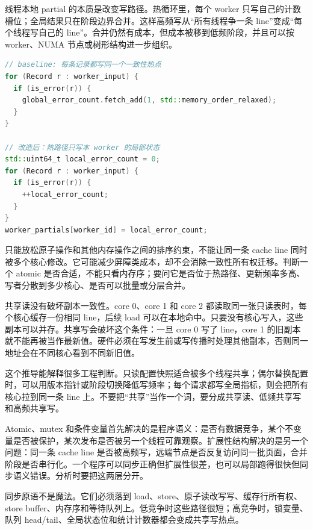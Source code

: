 线程本地 partial 的本质是改变写路径。热循环里，每个 worker 只写自己的计数槽位；全局结果只在阶段边界合并。这样高频写从“所有线程争一条 line”变成“每个线程写自己的 line”。合并仍然有成本，但成本被移到低频阶段，并且可以按 worker、NUMA 节点或树形结构进一步组织。

\begin{lstlisting}[language=C++,caption={从共享写热点到局部 partial 的伪代码}]
// baseline: 每条记录都写同一个一致性热点
for (Record r : worker_input) {
  if (is_error(r)) {
    global_error_count.fetch_add(1, std::memory_order_relaxed);
  }
}

// 改造后：热路径只写本 worker 的局部状态
std::uint64_t local_error_count = 0;
for (Record r : worker_input) {
  if (is_error(r)) {
    ++local_error_count;
  }
}
worker_partials[worker_id] = local_error_count;
\end{lstlisting}

 只能放松原子操作和其他内存操作之间的排序约束，不能让同一条 cache line 同时被多个核心修改。它可能减少屏障类成本，却不会消除一致性所有权迁移。判断一个 atomic 是否合适，不能只看内存序；要问它是否位于热路径、更新频率多高、写者分散到多少核心、是否可以批量或分层合并。

共享读没有破坏副本一致性。core 0、core 1 和 core 2 都读取同一张只读表时，每个核心缓存一份相同 line，后续 load 可以在本地命中。只要没有核心写入，这些副本可以并存。共享写会破坏这个条件：一旦 core 0 写了 line，core 1 的旧副本就不能再被当作最新值。硬件必须在写发生前或写传播时处理其他副本，否则同一地址会在不同核心看到不同新旧值。

这个推导能解释很多工程判断。只读配置快照适合被多个线程共享；偶尔替换配置时，可以用版本指针或阶段切换降低写频率；每个请求都写全局指标，则会把所有核心拉到同一条 line 上。不要把“共享”当作一个词，要分成共享读、低频共享写和高频共享写。

Atomic、mutex 和条件变量首先解决的是程序语义：是否有数据竞争，某个不变量是否被保护，某次发布是否被另一个线程可靠观察。扩展性结构解决的是另一个问题：同一条 cache line 是否被高频写，远端节点是否反复访问同一批页面，合并阶段是否串行化。一个程序可以同步正确但扩展性很差，也可以局部跑得很快但同步语义错误。分析时要把这两层分开。

同步原语不是魔法。它们必须落到 load、store、原子读改写写、缓存行所有权、store buffer、内存序和等待队列上。低竞争时这些路径很短；高竞争时，锁变量、队列 head/tail、全局状态位和统计计数器都会变成共享写热点。

